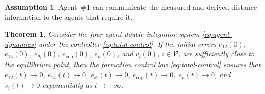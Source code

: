 \documentclass[letterpaper,journal]{IEEEtran}
\theoremstyle{plain}
\newtheorem{theorem}{Theorem}
\theoremstyle{definition}
\newtheorem{assumption}{Assumption}
\theoremstyle{remark}
\begin{document}
\begin{assumption}
Agent~\#1 can communicate the measured and derived distance information to the agents that require it.
\end{assumption}

\begin{theorem}
\label{thm:local-stability}
Consider the four-agent double-integrator system \eqref{eq:agent-dynamics} under the controller \eqref{eq:total-control}. If the initial errors \(e_{12}(0)\), \(e_{14}(0)\), \(e_{\theta_i}(0)\), \(e_{\mathrm{cop}}(0)\), \(e_n(0)\), and \(\tilde v_i(0)\), \(i\in\mathcal V\), are sufficiently close to the equilibrium point, then the formation control law \eqref{eq:total-control} ensures that \(e_{12}(t)\to0\), \(e_{14}(t)\to0\), \(e_{\theta_i}(t)\to0\), \(e_{\mathrm{cop}}(t)\to0\), \(e_n(t)\to0\), and \(\tilde v_i(t)\to0\) exponentially as \(t\to+\infty\).
\end{theorem}
\end{document}
